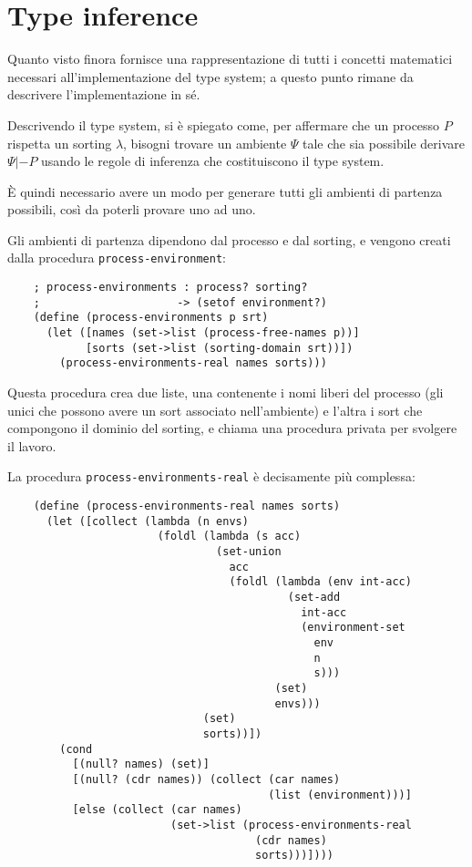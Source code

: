 \section{Type inference}

Quanto visto finora fornisce una rappresentazione di tutti i concetti
matematici necessari all'implementazione del type system; a questo punto
rimane da descrivere l'implementazione in s\'e.

Descrivendo il type system, si \`e spiegato come, per affermare che
un processo $P$ rispetta un sorting $\lambda$, bisogni trovare un
ambiente $\Psi$ tale che sia possibile derivare $\Psi |- P$ usando le
regole di inferenza che costituiscono il type system.

\`E quindi necessario avere un modo per generare tutti gli ambienti
di partenza possibili, cos\`i da poterli provare uno ad uno.

Gli ambienti di partenza dipendono dal processo e dal sorting, e vengono
creati dalla procedura \lstinline{process-environment}:

\begin{lstlisting}
    ; process-environments : process? sorting?
    ;                     -> (setof environment?)
    (define (process-environments p srt)
      (let ([names (set->list (process-free-names p))]
            [sorts (set->list (sorting-domain srt))])
        (process-environments-real names sorts)))
\end{lstlisting}

Questa procedura crea due liste, una contenente i nomi liberi del
processo (gli unici che possono avere un sort associato nell'ambiente)
e l'altra i sort che compongono il dominio del sorting, e chiama una
procedura privata per svolgere il lavoro.

La procedura \lstinline{process-environments-real} \`e decisamente
pi\`u complessa:

\begin{lstlisting}
    (define (process-environments-real names sorts)
      (let ([collect (lambda (n envs)
                       (foldl (lambda (s acc)
                                (set-union
                                  acc
                                  (foldl (lambda (env int-acc)
                                           (set-add
                                             int-acc
                                             (environment-set
                                               env
                                               n
                                               s)))
                                         (set)
                                         envs)))
                              (set)
                              sorts))])
        (cond
          [(null? names) (set)]
          [(null? (cdr names)) (collect (car names)
                                        (list (environment)))]
          [else (collect (car names)
                         (set->list (process-environments-real
                                      (cdr names)
                                      sorts)))])))
\end{lstlisting}

